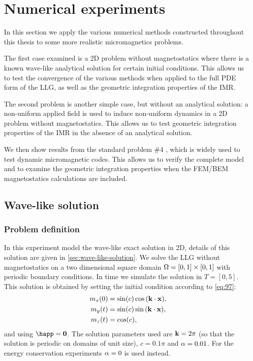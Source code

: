 \chapter{Numerical experiments}
\label{cha:numer-experiments}

In this section we apply the various numerical methods constructed throughout this thesis to some more realistic micromagnetics problems.

The first case examined is a 2D problem without magnetostatics where there is a known wave-like analytical solution for certain initial conditions.
This allows us to test the convergence of the various methods when applied to the full PDE form of the LLG, as well as the geometric integration properties of the IMR.

The second problem is another simple case, but without an analytical solution: a non-uniform applied field is used to induce non-uniform dynamics in a 2D problem without magnetostatics.
This allows us to test geometric integration properties of the IMR in the absence of an analytical solution.

We then show results from the \mumag standard problem \#4 \cite{mumag-website}, which is widely used to test dynamic micromagnetic codes.
This allows us to verify the complete model and to examine the geometric integration properties when the FEM/BEM magnetostatics calculations are included.


\section{Wave-like solution}
\label{sec:numer-exper}

\subsection{Problem definition}
\label{sec:wave-problem-definition}

In this experiment model the wave-like exact solution in 2D, details of this solution are given in \cref{sec:wave-like-solution}.
We solve the LLG without magnetostatics on a two dimensional square domain $\Omega = [0,1] \times [0,1]$ with periodic boundary conditions.
In time we simulate the solution in $T = [0, 5]$.
This solution is obtained by setting the initial condition according to \cref{eq:97}:
\begin{equation}
  \begin{aligned}
    m_x(0) &= \sin(c) \cos{\left( \boldsymbol{\mathrm{k}}\cdot \boldsymbol{\mathrm{x}}\right)}, \\
    m_y(t) &= \sin(c) \sin{\left( \boldsymbol{\mathrm{k}}\cdot \boldsymbol{\mathrm{x}}\right)}, \\
    m_z(t) &= \cos(c),
  \end{aligned}
\end{equation}
and using $\happ = \zerov$.
The solution parameters used are $\boldsymbol{\mathrm{k}} = 2\pi$ (so that the solution is periodic on domains of unit size), $c = 0.1\pi$ and $\alpha = 0.01$.
For the energy conservation experiments $\alpha = 0$ is used instead.

